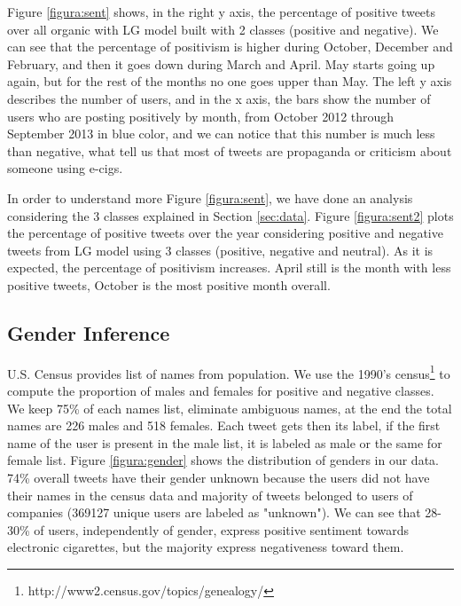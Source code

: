 \documentclass{sig-alternate}
\begin{document}
Figure \ref{figura:sent} shows, in the right y axis, the percentage of positive tweets over all organic with LG model built with 2 classes (positive and negative). We can see that the percentage of positivism is higher during October, December and February, and then it goes down during March and April. May starts going up again, but for the rest of the months no one goes upper than May. The left y axis describes the number of users, and in the x axis, the bars show the number of users who are posting positively by month, from October 2012 through September 2013 in blue color, and we can notice that this number is much less than negative, what tell us that most of tweets are propaganda or criticism about someone using e-cigs. 

In order to understand more Figure \ref{figura:sent}, we have done an analysis considering the 3 classes explained in Section \ref{sec:data}. Figure \ref{figura:sent2} plots the percentage of positive tweets over the year considering positive and negative tweets from LG model using 3 classes (positive, negative and neutral). As it is expected, the percentage of positivism increases. April still is the month with less positive tweets, October is the most positive month overall.

\subsection{Gender Inference}

U.S. Census provides list of names from population. We use the 1990's census\footnote{http://www2.census.gov/topics/genealogy/} to compute the proportion of males and females for positive and negative classes. We keep 75\% of each names list, eliminate ambiguous names, at the end the total names are 226 males and 518 females. Each tweet gets then its label, if the first name of the user is present in the male list, it is labeled as male or the same for female list. Figure \ref{figura:gender} shows the distribution of genders in our data. 74\% overall tweets have their gender unknown because the users did not have their names in the census data and majority of tweets belonged to users of companies (369127 unique users are labeled as "unknown"). We can see that 28-30\% of users, independently of gender, express positive sentiment towards electronic cigarettes, but the majority express negativeness toward them.

\end{document}
